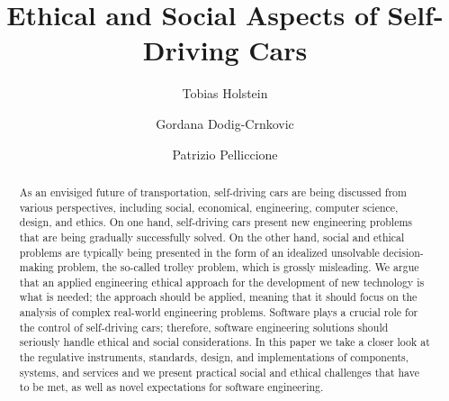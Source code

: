 \documentclass[sigconf,review, anonymous]{acmart}
\begin{document}
\title{Ethical and Social Aspects of Self-Driving Cars}




\author{Tobias Holstein}

\author{Gordana Dodig-Crnkovic}


\author{Patrizio Pelliccione}



\renewcommand{\shortauthors}{T. Holstein et al.}



\begin{acronym}
\end{acronym}





\begin{abstract}
As an envisiged future of transportation, self-driving cars are being discussed from various perspectives, including social, economical, engineering, computer science, design, and ethics. On one hand, self-driving cars present new engineering problems that are being gradually successfully solved. On the other hand, social and ethical problems are typically being presented in the form of an idealized unsolvable decision-making problem, the so-called trolley problem, which is grossly misleading. We argue that an applied engineering ethical approach for the development of new technology is what is needed; the approach should be applied, meaning that it should focus on the analysis of complex real-world engineering problems. Software plays a crucial role for the control of self-driving cars; therefore, software engineering  solutions should seriously handle ethical and social considerations. 
In this paper we take a closer look at the regulative instruments, standards, design, and implementations of components, systems, and services and we present practical social and ethical challenges that have to be met, as well as novel expectations for software engineering.
\end{abstract}
\end{document}
